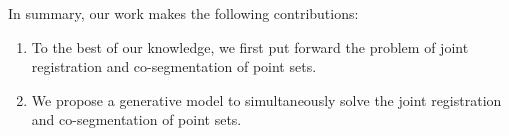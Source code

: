 In summary, our work makes the following contributions: 
\begin{enumerate}
	\item To the best of our knowledge, we first put forward the problem of joint registration and co-segmentation of point sets.
	
	\item We propose a generative model to simultaneously solve the joint registration and co-segmentation of point sets.
	
	
\end{enumerate}